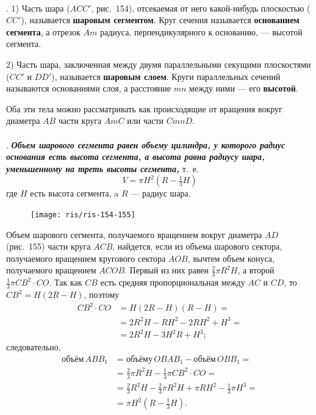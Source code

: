 \documentclass[twoside]{book}
\begin{document}
\paragraph{}\label{1938/s148}
.
1) Часть шара ($ACC'$, рис.~154), отсекаемая от него какой-нибудь плоскостью ($CC'$), называется \textbf{шаровым сегментом}.
Круг сечения называется \textbf{основанием сегмента}, а отрезок $Am$ радиуса, перпендикулярного к основанию, --- высотой сегмента.

2) Часть шара, заключенная между двумя параллельными секущими плоскостями ($CC'$ и $DD'$), называется \textbf{шаровым слоем}.
Круги параллельных сечений называются основаниями слоя, а расстояние $mn$ между ними --- его \textbf{высотой}.

Оба эти тела можно рассматривать как происходящие от вращения вокруг диаметра $AB$ части круга $AmC$ или части $CmnD$.

\paragraph{}\label{1938/s149}
.
\textbf{\emph{Объем шарового сегмента равен объему цилиндра, у которого радиус основания есть высота сегмента, а высота равна радиусу шара, уменьшенному на треть высоты сегмента,}} т.~е.
\[ V = \pi H^2(R-\tfrac13 H)\]
где $H$ есть высота сегмента, a $R$ --- радиус шара.

\begin{figure}[h!]
\centering
\texttt{[image: ris/ris-154-155]}
\caption{}
\end{figure}

Объем шарового сегмента, получаемого вращением вокруг диаметра $AD$ (рис.~155) части круга $ACB$, найдется, если из объема шарового сектора, получаемого вращением кругового сектора $AOB$, вычтем объем конуса, получаемого вращением $ACOB$.
Первый из них равен $\tfrac23\pi R^2H$, а второй $\tfrac13\pi CB^2\cdot CO$.
Так как $CB$ есть средняя пропорциональная между $AC$ и $CD$, то $CB^2 = H(2R - H)$, поэтому
\begin{align*}
CB^2\cdot CO &= H(2R - H)(R - H)=
\\
&=2R^2H - RH^2 - 2RH^2 + H^3 =
\\
&= 2R^2H-3H^2R + H^3;
\end{align*}
следовательно, 
\begin{align*}
\text{объём}\, ABB_1
&= \text{объёму}\, OBAB_1- \text{объём}\, OBB_1=
\\
&=\tfrac23\pi R^2H -\tfrac13 \pi CB^2\cdot CO = 
\\
&=\tfrac23 R^2H - \tfrac23\pi R^2H + \pi RH^2 - \tfrac13\pi H^3 = 
\\
&= \pi H^2(R-\tfrac13H). 
\end{align*}
\end{document}
